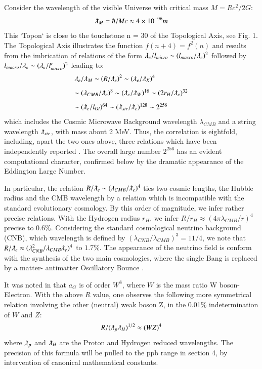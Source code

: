 \documentclass[twoside,draft]{article}
\begin{document}
\begin{sloppypar}
Consider the wavelength of the visible Universe with critical mass $M= Rc^2/2G$: $$\lambdabar_{M} = \hbar /Mc \approx 4 \times 10^{-96} m$$ This `Topon` is close to the touchstone n = 30 of the Topological Axis, see Fig. 1. The Topological Axis illustrates the function $f(n + 4) = f^{2}(n)$
and results from the imbrication of relations of the form 
$
\lambdabar_{e} /l_{micro} \sim (l_{macro} /\lambdabar_{e})^{2}
$
followed by 
$
l_{macro} /\lambdabar_{e} \sim (\lambdabar_{e} /l^{\prime}_{micro} )^{2}
$ leading to:
$$
\begin{array}{ll}
%
\displaystyle
\lambdabar_{e}/\lambdabar_{M} \sim (R/\lambdabar_{e})^{2} \sim (\lambdabar_{e}/ \lambdabar_{X})^{4}\\[+8pt]  %
\sim (\lambda_{CMB}/ \lambdabar_{e})^{8} \sim (\lambdabar_{e}/\lambdabar_{W})^{16} \sim (2r_{H} /\lambdabar_{e})^{32}\\[+8pt] %
\sim (\lambdabar_{e}/ l_{Gl} )^{64} \sim (\lambdabar_{str} /\lambdabar_{e} )^{128} \sim 2^{256}\\ %
\end{array}
$$
which includes the Cosmic Microwave Background wavelength $\lambda_{CMB}$ and a string wavelength $\lambdabar_{str}$, with mass about 2 MeV. Thus, the correlation is eightfold,
including, apart the two ones above, three relations which have been independently reported \cite{Sanchez1}.
The overall large number $2^{256}$ has an evident computational character, confirmed below by the
dramatic appearance of the Eddington Large Number.

In particular, the relation $R/\lambdabar_{e} \sim (\lambda_{CMB} / \lambdabar_{e})^{4}$ ties two cosmic lengths, the Hubble radius and the CMB wavelength by a relation which is incompatible with the standard evolutionary cosmology. By this order of magnitude, we infer rather precise relations. With the Hydrogen radius $r_H$, we infer 
$
R/r_H \approx (4\pi \lambda_{CMB} /r)^{4}
$ 
precise to $0.6\%$. 
Considering the standard cosmological neutrino background (CNB), which wavelength is defined by $(\lambda_{CNB} / \lambda_{CMB})^{3} = 11/4$, we note that $R/ \lambdabar_{e} \approx
( \lambda_{CNB}^{2} / \lambda_{CMB} \lambdabar_{e} )^{4}$ to $1.7\%$.
The appearance of the neutrino field is conform
with the synthesis of the two main cosmologies, where the single Bang is replaced by a matter-
antimatter Oscillatory Bounce \cite{Sanchez2}.

It was noted in \cite{Carr} that $a_{G}$ is of order $W^{8}$, where $W$ is the mass ratio W boson-
Electron. With the above $R$ value, one observes the following more symmetrical relation involving
the other (neutral) weak boson Z, in the 0.01\% indetermination of $W$ and $Z$:
\begin{equation}
R/(\lambdabar_{p}\lambdabar_{H})^{1/2}\approx (WZ)^4
\end{equation}
where $\lambdabar_{p}$ and $\lambdabar_{H}$ are the Proton and Hydrogen reduced wavelengths. The precision of this formula will be pulled to the ppb range in section 4, by intervention of canonical mathematical constants.


\end{sloppypar}
\end{document}
